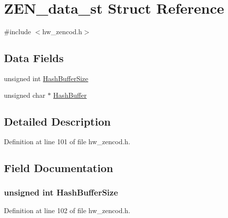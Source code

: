 \hypertarget{struct_z_e_n__data__st}{}\section{Z\+E\+N\+\_\+data\+\_\+st Struct Reference}
\label{struct_z_e_n__data__st}


{\ttfamily \#include $<$hw\+\_\+zencod.\+h$>$}

\subsection*{Data Fields}
\begin{DoxyCompactItemize}
\item 
unsigned int \hyperlink{struct_z_e_n__data__st_ac8cd932a554d7ecd716d54dc94a2d9cb}{Hash\+Buffer\+Size}
\item 
unsigned char $\ast$ \hyperlink{struct_z_e_n__data__st_a62ede32ce062d7fb677d0f2470baa8da}{Hash\+Buffer}
\end{DoxyCompactItemize}


\subsection{Detailed Description}


Definition at line 101 of file hw\+\_\+zencod.\+h.



\subsection{Field Documentation}
\subsubsection[{\texorpdfstring{Hash\+Buffer\+Size}{HashBufferSize}}]{\setlength{\rightskip}{0pt plus 5cm}unsigned int Hash\+Buffer\+Size}\hypertarget{struct_z_e_n__data__st_ac8cd932a554d7ecd716d54dc94a2d9cb}{}\label{struct_z_e_n__data__st_ac8cd932a554d7ecd716d54dc94a2d9cb}


Definition at line 102 of file hw\+\_\+zencod.\+h.

